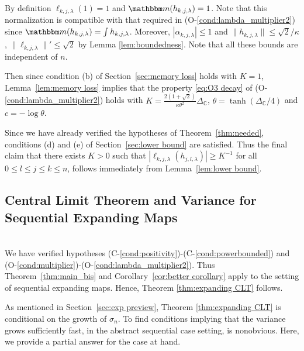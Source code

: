 \documentclass{amsart}
\numberwithin{equation}{section}
\newcommand\bC{{\mathbb C}}
\newcommand{\bbm}{\mathbbm m}
\begin{document}
By definition $\ell_{k,j,\lambda}(1)=1$ and $\bbm(h_{k,j,\lambda})=1$.
Note that this normalization is compatible with that required in (O-\ref{cond:lambda_multiplier2})
since $\bbm(h_{k,j,\lambda}) = \int h_{k,j,\lambda}$. 
Moreover, $|\alpha_{k,j,\lambda}| \le 1$ and $\| h_{k,j,\lambda} \| \le \sqrt{2}/\kappa$,
$\| \ell_{k,j,\lambda} \|' \le \sqrt{2}$ by Lemma \ref{lem:boundedness}. 
Note that all these bounds are independent of $n$.

Then since condition (b) of Section~\ref{sec:memory loss} holds with $K=1$, 
Lemma~\ref{lem:memory loss}
implies that  the property \eqref{eq:O3 decay} of (O-\ref{cond:lambda_multiplier2}) holds with $K = \frac{ 2(1+\sqrt{2}) }{\kappa \theta^2} \Delta_{\bC}$,
$\theta = \tanh(\Delta_{\bC}/4)$
and $c =  - \log \theta$.

Since we have already verified the hypotheses of Theorem~\ref{thm:needed}, conditions (d) and (e) of Section~\ref{sec:lower bound} are satisfied.
Thus the final claim that  there exists $K >0$ such that $|\ell_{k,j,\lambda}(h_{j,l,\lambda})| \ge K^{-1}$ for all $0 \le l \le j \le k \le n$, follows immediately from Lemma~\ref{lem:lower bound}.


\subsection{Central Limit Theorem and Variance for Sequential Expanding Maps}\ \\
\label{sec:CLT expanding}
We have verified hypotheses (C-\ref{cond:positivity})-(C-\ref{cond:powerbounded}) and 
(O-\ref{cond:multiplier})-(O-\ref{cond:lambda_multiplier2}). Thus Theorem~\ref{thm:main_bis}
and Corollary~\ref{cor:better corollary} apply to the setting of sequential expanding maps. Hence, Theorem \ref{thm:expanding CLT} follows.

 As mentioned in Section~\ref{sec:exp preview}, Theorem \ref{thm:expanding CLT} is conditional on the growth of $\sigma_n$. 
To find conditions implying that the variance grows sufficiently fast, in the abstract sequential case setting, is nonobvious.
Here, we provide a partial answer for the case at hand.
\end{document}
